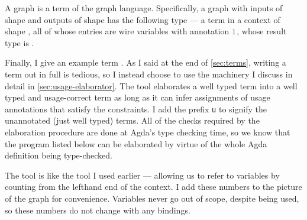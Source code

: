 
A graph is a term of the graph language.
Specifically, a graph with inputs of shape  and outputs of shape
 has the following type --- a term in a context of shape
, all of whose entries are wire variables with annotation $\gr1$,
whose result type is \AgdaSpace{}.


Finally, I give an example term .
As I said at the end of \cref{sec:terms}, writing a term out in full is tedious,
so I instead choose to use the machinery I discuss in detail in
\cref{sec:usage-elaborator}.
The  tool elaborates a well typed term into a well
typed and usage-correct term as long as it can infer assignments of usage
annotations that satisfy the constraints.
I add the prefix \texttt{u} to signify the unannotated (just well typed) terms.
All of the checks required by the elaboration procedure are done at Agda's type
checking time, so we know that the program listed below can be elaborated by
virtue of the whole Agda definition being type-checked.

The  tool is like the  tool I used
earlier --- allowing us to refer to variables by counting from the lefthand end
of the context.
I add these numbers to the picture of the graph for convenience.
Variables never go out of scope, despite being used, so these numbers do not
change with any bindings.

\noindent
\begin{minipage}[t]{0.33\textwidth}
\end{minipage}
\begin{minipage}[t]{0.67\textwidth}
  \AgdaNoSpaceAroundCode{}
  \AgdaSpaceAroundCode{}
\end{minipage}

